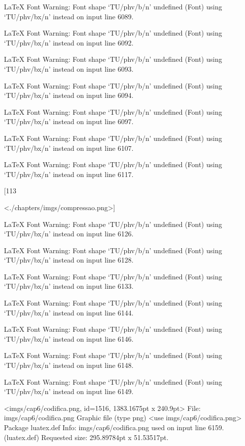 LaTeX Font Warning: Font shape `TU/phv/b/n' undefined
(Font)              using `TU/phv/bx/n' instead on input line 6089.


LaTeX Font Warning: Font shape `TU/phv/b/n' undefined
(Font)              using `TU/phv/bx/n' instead on input line 6092.


LaTeX Font Warning: Font shape `TU/phv/b/n' undefined
(Font)              using `TU/phv/bx/n' instead on input line 6093.


LaTeX Font Warning: Font shape `TU/phv/b/n' undefined
(Font)              using `TU/phv/bx/n' instead on input line 6094.


LaTeX Font Warning: Font shape `TU/phv/b/n' undefined
(Font)              using `TU/phv/bx/n' instead on input line 6097.


LaTeX Font Warning: Font shape `TU/phv/b/n' undefined
(Font)              using `TU/phv/bx/n' instead on input line 6107.


LaTeX Font Warning: Font shape `TU/phv/b/n' undefined
(Font)              using `TU/phv/bx/n' instead on input line 6117.

[113

<./chapters/imgs/compressao.png>]

LaTeX Font Warning: Font shape `TU/phv/b/n' undefined
(Font)              using `TU/phv/bx/n' instead on input line 6126.


LaTeX Font Warning: Font shape `TU/phv/b/n' undefined
(Font)              using `TU/phv/bx/n' instead on input line 6128.


LaTeX Font Warning: Font shape `TU/phv/b/n' undefined
(Font)              using `TU/phv/bx/n' instead on input line 6133.


LaTeX Font Warning: Font shape `TU/phv/b/n' undefined
(Font)              using `TU/phv/bx/n' instead on input line 6144.


LaTeX Font Warning: Font shape `TU/phv/b/n' undefined
(Font)              using `TU/phv/bx/n' instead on input line 6146.


LaTeX Font Warning: Font shape `TU/phv/b/n' undefined
(Font)              using `TU/phv/bx/n' instead on input line 6148.


LaTeX Font Warning: Font shape `TU/phv/b/n' undefined
(Font)              using `TU/phv/bx/n' instead on input line 6149.

<imgs/cap6/codifica.png, id=1516, 1383.1675pt x 240.9pt>
File: imgs/cap6/codifica.png Graphic file (type png)
<use imgs/cap6/codifica.png>
Package luatex.def Info: imgs/cap6/codifica.png  used on input line 6159.
(luatex.def)             Requested size: 295.89784pt x 51.53517pt.

